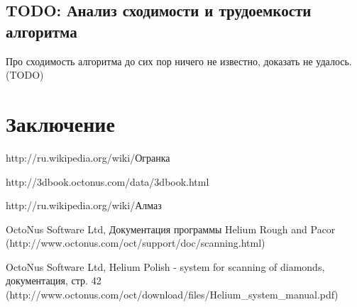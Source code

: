 \documentclass[a4paper,12pt, titlepage]{article}
\begin{document}
\subsection{TODO: Анализ сходимости и трудоемкости алгоритма}
Про сходимость алгоритма до сих пор ничего не известно, доказать не удалось.
(TODO)

\newpage
\section{Заключение}

\newpage
\begin{thebibliography}{99}                    %

http://ru.wikipedia.org/wiki/Огранка

http://3dbook.octonus.com/data/3dbook.html

http://ru.wikipedia.org/wiki/Алмаз

OctoNus Software Ltd, Документация программы Helium Rough and Pacor 
(http://www.octonus.com/oct/support/doc/scanning.html)

OctoNus Software Ltd, Helium Polish - system for scanning of diamonds, документация, стр. 42
(http://www.octonus.com/oct/download/files/Helium\_system\_manual.pdf)

\end{thebibliography}
\end{document}
